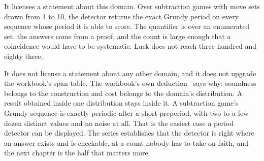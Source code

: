 It licenses a statement about this domain. Over subtraction games with move sets drawn from 1 to 10,
the detector returns the exact Grundy period on every sequence whose period it is able to score. The
quantifier is over an enumerated set, the answers come from a proof, and the count is large enough
that a coincidence would have to be systematic. Luck does not reach three hundred and eighty three.

It does not license a statement about any other domain, and it does not upgrade the workbook's span
table. The workbook's own deduction~\cite{src:Quigg-orior-workbook} says why: soundness belongs to the construction and cost belongs
to the domain's distribution. A result obtained inside one distribution stays inside it. A
subtraction game's Grundy sequence is exactly periodic after a short preperiod, with two to a few
dozen distinct values and no noise at all. That is the easiest case a period detector can be displayed. The series establishes that the detector is right where an answer exists and is checkable,
at a count nobody has to take on faith, and the next chapter is the half that matters more.
